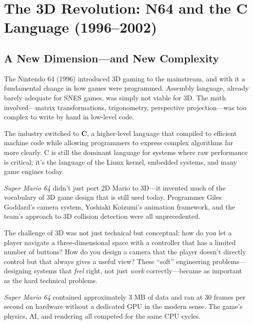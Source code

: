 \documentclass[11pt,letterpaper]{article}
\newcommand{\keyterm}[1]{\textbf{\textcolor{cssecondary}{#1}}}
\begin{document}
\section{The 3D Revolution: N64 and the C Language (1996--2002)}

\subsection{A New Dimension---and New Complexity}

The Nintendo 64 (1996) introduced 3D gaming to the mainstream, and with it a fundamental change in how games were programmed. Assembly language, already barely adequate for SNES games, was simply not viable for 3D. The math involved---matrix transformations, trigonometry, perspective projection---was too complex to write by hand in low-level code.

The industry switched to \keyterm{C}, a higher-level language that compiled to efficient machine code while allowing programmers to express complex algorithms far more clearly. C is still the dominant language for systems where raw performance is critical; it's the language of the Linux kernel, embedded systems, and many game engines today.

\begin{historybox}
\textit{Super Mario 64} didn't just port 2D Mario to 3D---it invented much of the vocabulary of 3D game design that is still used today. Programmer Giles Goddard's camera system, Yoshiaki Koizumi's animation framework, and the team's approach to 3D collision detection were all unprecedented.

The challenge of 3D was not just technical but conceptual: how do you let a player navigate a three-dimensional space with a controller that has a limited number of buttons? How do you design a camera that the player doesn't directly control but that always gives a useful view? These ``soft'' engineering problems---designing systems that \textit{feel} right, not just \textit{work} correctly---became as important as the hard technical problems.

\textit{Super Mario 64} contained approximately 3 MB of data and ran at 30 frames per second on hardware without a dedicated GPU in the modern sense. The game's physics, AI, and rendering all competed for the same CPU cycles.
\end{historybox}
\end{document}
